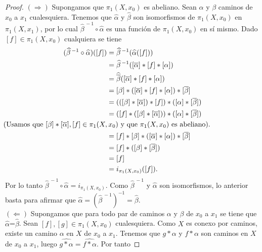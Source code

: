 \begin{proof}
   $(\Rightarrow)$ Supongamos que $\pi_1(X,x_0)$ es abeliano. Sean $\alpha$ y $\beta$ caminos de $x_0$ a $x_1$ cualesquiera. Tenemos que $\widehat{\alpha}$ y $\widehat{\beta}$ son isomorfismos de $\pi_1(X,x_0)$ en $\pi_1(X,x_1)$, por lo cual ${\widehat{\beta}}^{\,-1}\circ\widehat{\alpha}$ es una función de $\pi_1(X,x_0)$ en sí mismo. Dado $[f]\in\pi_1(X,x_0)$ cualquiera se tiene
   \begin{align*}
   ({\widehat{\beta}}^{\,-1}\circ\widehat{\alpha})([f]) &= {\widehat{\beta}}^{\,-1}(\widehat{\alpha}([f]))\\
                                                      &= {\widehat{\beta}}^{\,-1}([\overline{\alpha}]*[f]*[\alpha])\\
                                                      &= \widehat{\overline{\beta}}([\overline{\alpha}]*[f]*[\alpha])\\
                                                      &= [\beta]*\left([\overline{\alpha}]*[f]*[\alpha]\right)*[\overline{\beta}]\\
                                                      &= (([\beta]*[\overline{\alpha}])*[f])*([\alpha]*[\overline{\beta}])\\
                                                      &= ([f]* ([\beta]*[\overline{\alpha}]))*([\alpha]*[\overline{\beta}])\\
                                                      & \mathclap{\text{(Usamos que } [\beta]*[\overline{\alpha}], [f] \in \pi_1(X,x_0) \text{ y que } \pi_1(X,x_0) \text{ es abeliano).}}\\
                                                      &= [f]*[\beta]*([\overline{\alpha}]*[\alpha])*[\overline{\beta}]\\
                                                      &= [f]*([\beta]*[\overline{\beta}])\\
                                                      &= [f]\\
                                                      &= i_{\pi_1(X,x_0)}([f]).
   \end{align*}
   Por lo tanto ${\widehat{\beta}}^{\,-1}\circ\widehat{\alpha}=i_{\pi_1(X,x_0)}$. Como ${\widehat{\beta}}^{\,-1}$ y $\widehat{\alpha}$ son isomorfismos, lo anterior basta para afirmar que $\widehat{\alpha}=\left( {\widehat{\beta}}^{\,-1}\right)^{-1}=\widehat{\beta}$.\\
   $(\Leftarrow)$ Supongamos que para todo par de caminos $\alpha$ y $\beta$ de $x_0$ a $x_1$ se tiene que $\widehat{\alpha}$=$\widehat{\beta}$. Sean $[f],[g]\in \pi_1(X,x_0)$ cualesquiera. Como $X$ es conexo por caminos, existe un camino $\alpha$ en $X$ de $x_0$ a $x_1$. Tenemos que $g*\alpha$ y $f*\alpha$ son caminos en $X$ de $x_0$ a $x_1$, luego $\widehat{g*\alpha}=\widehat{f*\alpha}$. Por tanto

\end{proof}
